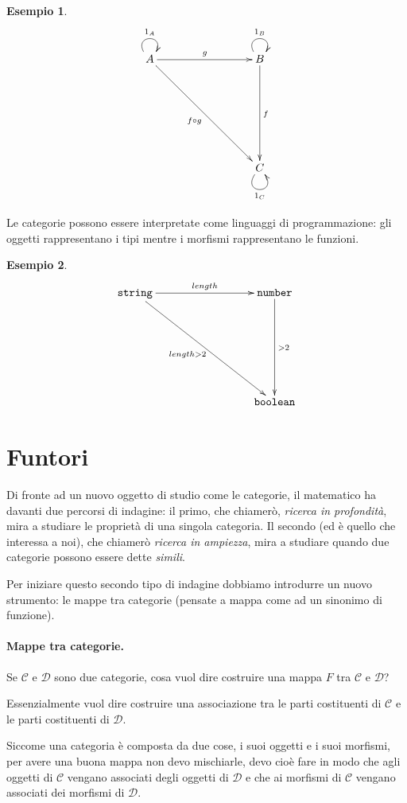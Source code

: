 \documentclass[12pt]{article}
\newtheorem{example}{Esempio}[section]
\begin{document}
\begin{example}
\[
\xymatrixrowsep{3cm}
\xymatrixcolsep{3cm}
\xymatrix{
  A \ar@(ul,ur)^{1_A} \ar[r]^g \ar[rd]_{f \circ g} & B \ar@(ul,ur)^{1_B} \ar[d]^f \\
    & C \ar@(dl,dr)_{1_C}
}
\]
\end{example}

Le categorie possono essere interpretate come linguaggi di programmazione: gli oggetti rappresentano i tipi mentre i morfismi
rappresentano le funzioni.

\begin{example}
\[
\xymatrixrowsep{3cm}
\xymatrixcolsep{3cm}
\xymatrix{
  {\texttt{string}} \ar[r]^{length} \ar[rd]_{length > 2} & {\texttt{number}} \ar[d]^{> 2} \\
    & {\texttt{boolean}}
}
\]
\end{example}

\newpage

\section{Funtori}

Di fronte ad un nuovo oggetto di studio come le categorie, il matematico ha davanti due percorsi di indagine: il primo, che chiamerò, \emph{ricerca in profondità},
mira a studiare le proprietà di una singola categoria. Il secondo (ed è quello che interessa a noi), che chiamerò \emph{ricerca in ampiezza},
mira a studiare quando due categorie possono essere dette \emph{simili}.

Per iniziare questo secondo tipo di indagine dobbiamo introdurre un nuovo strumento: le mappe tra categorie
(pensate a mappa come ad un sinonimo di funzione).

\paragraph{Mappe tra categorie.} Se $\mathcal{C}$ e $\mathcal{D}$ sono due categorie, cosa vuol dire costruire una mappa $F$ tra $\mathcal{C}$ e $\mathcal{D}$?

Essenzialmente vuol dire costruire una associazione tra le parti costituenti di $\mathcal{C}$ e le parti costituenti di $\mathcal{D}$.

Siccome una categoria è composta da due cose, i suoi oggetti e i suoi morfismi, per avere una buona mappa non devo mischiarle,
devo cioè fare in modo che agli oggetti di $\mathcal{C}$ vengano associati degli oggetti di $\mathcal{D}$ e che ai morfismi di
$\mathcal{C}$ vengano associati dei morfismi di $\mathcal{D}$.
\end{document}
